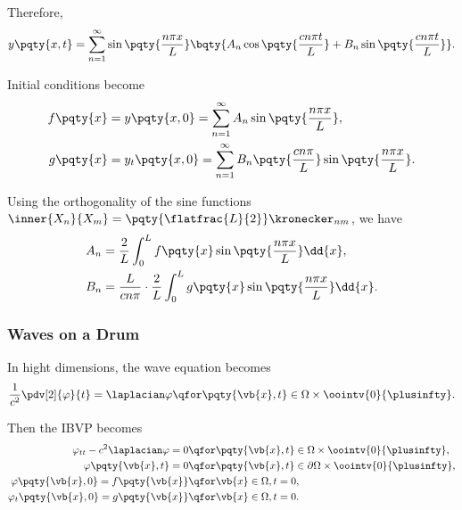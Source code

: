 {Therefore,
\begin{equation}
    y\pqty{x, t} = \sum_{n = 1}^{\infty} \sin \pqty{\frac{n \pi x}{L}} \bqty{A_n \cos \pqty{\frac{c n \pi t}{L}} + B_n \sin \pqty{\frac{c n \pi t}{L}}}.
\end{equation}

Initial conditions become
\begin{subequations}
    \begin{align}
        f\pqty{x} &= y\pqty{x, 0} = \sum_{n = 1}^{\infty} A_n \sin \pqty{\frac{n \pi x}{L}}, \\
        g\pqty{x} &= y_t\pqty{x, 0} = \sum_{n = 1}^{\infty} B_n \pqty{\frac{c n \pi}{L}} \sin \pqty{\frac{n \pi x}{L}}.
    \end{align}
\end{subequations}

Using the orthogonality of the sine functions \(\inner{X_n}{X_m} = \pqty{\flatfrac{L}{2}} \kronecker_{nm}\), we have
\begin{subequations}
    \begin{align}
        A_n &= \frac{2}{L} \int_{0}^{L} f\pqty{x} \sin \pqty{\frac{n \pi x}{L}} \dd{x}, \\
        B_n &= \frac{L}{c n \pi} \cdot \frac{2}{L} \int_{0}^{L} g\pqty{x} \sin \pqty{\frac{n \pi x}{L}} \dd{x}.
    \end{align}
\end{subequations}

\subsubsection{Waves on a Drum}

In hight dimensions, the wave equation becomes
\begin{equation}
    \frac{1}{c^2} \pdv[2]{\varphi}{t} = \laplacian \varphi \qfor \pqty{\vb{x}, t} \in \Omega \times \oointv{0}{\plusinfty}.
\end{equation}

Then the IBVP becomes
\begin{subequations}
    \begin{align}
        \varphi_{tt} - c^2 \laplacian \varphi = 0 & \qfor \pqty{\vb{x}, t} \in \Omega \times \oointv{0}{\plusinfty}, \\
        \varphi\pqty{\vb{x}, t} = 0 &\qfor \pqty{\vb{x}, t} \in \partial \Omega \times \oointv{0}{\plusinfty}, \\
        \varphi\pqty{\vb{x}, 0} = f\pqty{\vb{x}} &\qfor \vb{x} \in \Omega, t = 0, \\
        \varphi_t\pqty{\vb{x}, 0} = g\pqty{\vb{x}} &\qfor \vb{x} \in \Omega, t = 0.
    \end{align}
\end{subequations}

}
